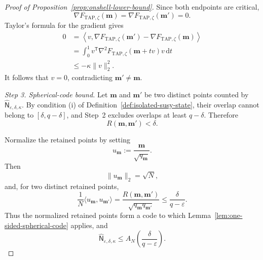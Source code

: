 \documentclass[10pt,a4paper]{amsart}
\newcommand{\TAP}{\mathrm{TAP}}
\newcommand{\bfm}{\mathbf{m}}
\newcommand{\dd}{\mathrm{d}}
\newcommand{\ve}{\varepsilon}
\begin{document}
\begin{proof}[Proof of Proposition~\ref{prop:onshell-lower-bound}]
		Since both endpoints are critical,
		\[
		\nabla F_{\TAP,\zeta}(\bfm)
		=
		\nabla F_{\TAP,\zeta}(\bfm')
		=0.
		\]
		Taylor's formula for the gradient gives
		\[
		\begin{aligned}
			0
			&=
			\left\langle
			v,
			\nabla F_{\TAP,\zeta}(\bfm')
			-
			\nabla F_{\TAP,\zeta}(\bfm)
			\right\rangle\\
			&=
			\int_0^1
			v^{\mathsf T}
			\nabla^2F_{\TAP,\zeta}(\bfm+tv)
			v\,\dd t\\
			&\le
			-\kappa\|v\|_2^2.
		\end{aligned}
		\]
		It follows that \(v=0\), contradicting \(\bfm'\ne\bfm\).
		
		\medskip\noindent\emph{Step 3. Spherical-code bound.}
		Let \(\bfm\) and \(\bfm'\) be two distinct points counted by
		\(\widehat{\mathsf N}_{\ve,\delta,\kappa}\). By condition
		\textup{(i)} of Definition~\ref{def:isolated-susy-state}, their overlap
		cannot belong to
		\([\delta,q-\delta]\), and Step~2 excludes overlaps at least
		\(q-\delta\). Therefore
		\[
		R(\bfm,\bfm')<\delta.
		\]
		
		Normalize the retained points by setting
		\[
		u_\bfm:=\frac{\bfm}{\sqrt{q_\bfm}}.
		\]
		Then
		\[
		\|u_\bfm\|_2=\sqrt N,
		\]
		and, for two distinct retained points,
		\[
		\frac1N
		\langle u_\bfm,u_{\bfm'}\rangle
		=
		\frac{R(\bfm,\bfm')}
		{\sqrt{q_\bfm q_{\bfm'}}}
		\le
		\frac{\delta}{q-\ve}.
		\]
		Thus the normalized retained points form a code to which
		Lemma~\ref{lem:one-sided-spherical-code} applies, and
		\begin{equation}\label{eq:geometric-code-count}
			\widehat{\mathsf N}_{\ve,\delta,\kappa}
			\le
			A_N\left(
			\frac{\delta}{q-\ve}
			\right).
		\end{equation}
		

\end{proof}
\end{document}
